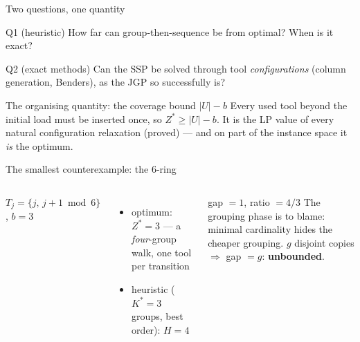 \documentclass[10pt]{beamer}
\newcommand{\U}{U}\newcommand{\Kst}{K^{\ast}}\newcommand{\Zst}{Z^{\ast}}
\begin{document}
\begin{frame}{Two questions, one quantity}
\begin{block}{Q1 (heuristic)}
How far can group-then-sequence be from optimal? When is it exact?
\end{block}
\begin{block}{Q2 (exact methods)}
Can the SSP be solved through tool \emph{configurations} (column generation,
Benders), as the JGP so successfully is?
\end{block}
\vspace{2mm}
\begin{alertblock}{The organising quantity: the coverage bound $|\U|-b$}
Every used tool beyond the initial load must be inserted once, so
$\Zst\ge|\U|-b$. It is the LP value of every natural configuration relaxation
(proved) --- and on part of the instance space it \emph{is} the optimum.
\end{alertblock}
\end{frame}

\begin{frame}{The smallest counterexample: the $6$-ring}
\begin{columns}
\centering
{}

{\footnotesize $T_j=\{j,\,j{+}1 \bmod 6\}$, $b=3$}
\begin{itemize}
  \item optimum: $\Zst=3$ --- a \emph{four}-group walk, one tool per transition
  \item heuristic ($\Kst=3$ groups, best order): $H=4$
\end{itemize}
\begin{alertblock}{gap $=1$, \quad ratio $=4/3$}
The grouping phase is to blame: minimal cardinality hides the cheaper
grouping. $g$ disjoint copies $\Rightarrow$ gap $=g$: \textbf{unbounded}.
\end{alertblock}
\end{columns}
\end{frame}
\end{document}
